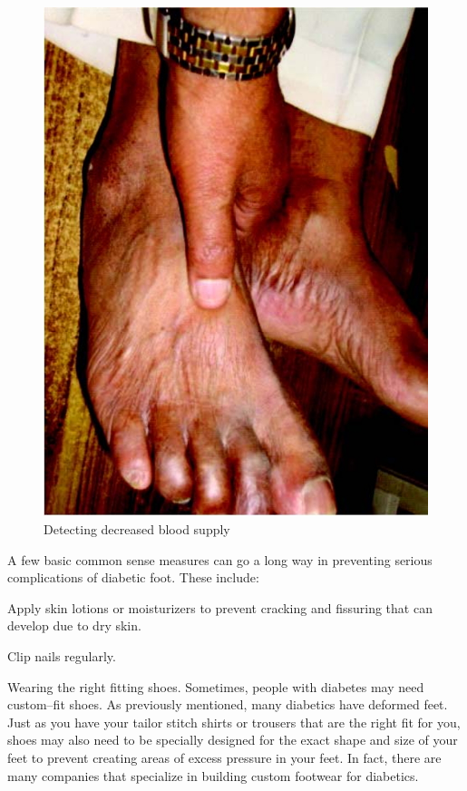 {\begin{figure}
\includegraphics{images/064.jpg}
\caption{Detecting decreased blood supply}
\end{figure}

A few basic common sense measures can go a long way in preventing serious complications of diabetic foot. These include:

\item Apply skin lotions or moisturizers to prevent cracking and fissuring that can develop due to dry skin.

 \item Clip nails regularly.

 \item 
 Wearing the right fitting shoes. Sometimes, people with diabetes may need custom–fit shoes. As previously mentioned, many diabetics have deformed feet. Just as you have your tailor stitch shirts or trousers that are the right fit for you, shoes may also need to be specially designed for the exact shape and size of your feet to prevent creating areas of excess pressure in your feet. In fact, there are many companies that specialize in building custom footwear for diabetics.

}
